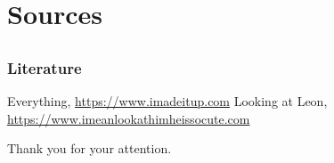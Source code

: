 \documentclass[compress]{beamer}
\begin{document}
\section{Sources}
\subsection*{}

\begin{frame}
\frametitle{Literature}
\begin{small}
\begin{thebibliography}{50}
 Everything, \url{https://www.imadeitup.com}
 Looking at Leon, \url{https://www.imeanlookathimheissocute.com}
\end{thebibliography}
\end{small}
\end{frame}

\begin{frame}
Thank you for your attention.
\end{frame}
\end{document}
